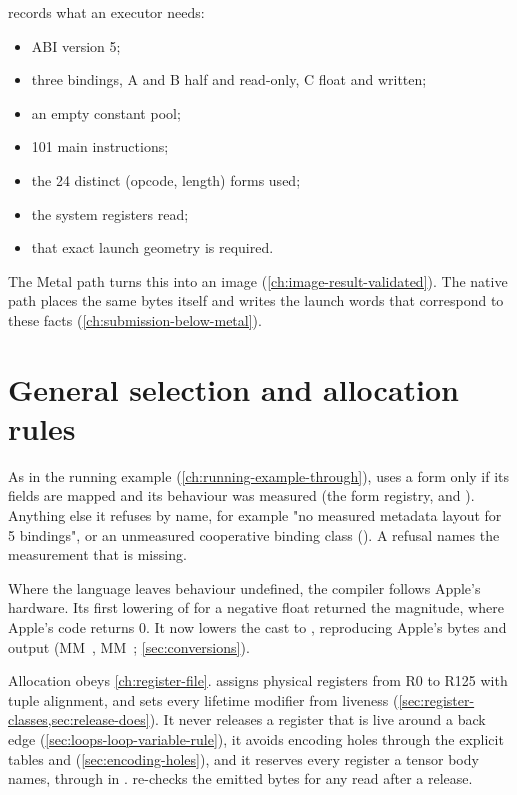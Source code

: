  records what an executor needs:

\begin{itemize}
\item ABI version 5;
\item three bindings, A and B half and read-only, C float and written;
\item an empty constant pool;
\item 101 main instructions;
\item the 24 distinct (opcode, length) forms used;
\item the system registers read;
\item that exact launch geometry is required.
\end{itemize}

The Metal path turns this into an image (\cref{ch:image-result-validated}). The native path places the same bytes itself and writes the
launch words that correspond to these facts (\cref{ch:submission-below-metal}).

\section{General selection and allocation rules}\label{ch:selection-allocation-general}

As in the running example (\cref{ch:running-example-through}),  uses a form only if its fields are mapped and its behaviour
was measured (the form registry,  and ). Anything else it refuses by name,
for example "no measured metadata layout for 5 bindings", or an unmeasured cooperative binding class
(). A refusal names the measurement that is missing.

Where the language leaves behaviour undefined, the compiler follows Apple's hardware. Its first lowering of
 for a negative float returned the magnitude, where Apple's code returns 0. It now lowers the cast to , reproducing Apple's bytes and output (MM~, MM~; \cref{sec:conversions}).

Allocation obeys \cref{ch:register-file}.  assigns physical registers from R0 to R125 with tuple alignment, and
sets every lifetime modifier from liveness (\cref{sec:register-classes,sec:release-does}). It never releases a register
that is live around a back edge (\cref{sec:loops-loop-variable-rule}), it avoids encoding holes through the explicit
tables  and  (\cref{sec:encoding-holes}), and it reserves every
register a tensor body names, through  in .
 re-checks the emitted bytes for any read after a release.


